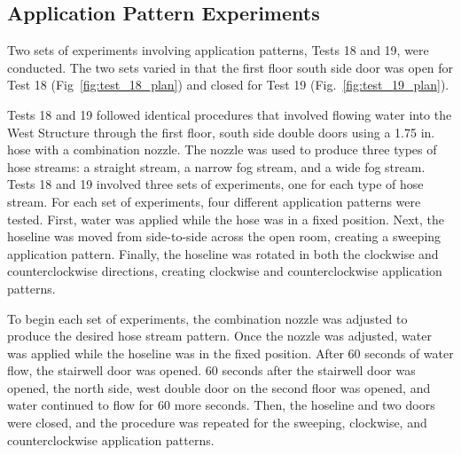 \documentclass[12pt,oneside]{book}
\begin{document}
\subsection{Application Pattern Experiments}
\label{Application_Pattern_Experiments}

Two sets of experiments involving application patterns, Tests 18 and 19, were conducted. The two sets varied in that the first floor south side door was open for Test 18 (Fig~\ref{fig:test_18_plan}) and closed for Test 19 (Fig.~\ref{fig:test_19_plan}).

Tests 18 and 19 followed identical procedures that involved flowing water into the West Structure through the first floor, south side double doors using a 1.75 in. hose with a combination nozzle. The nozzle was used to produce three types of hose streams: a straight stream, a narrow fog stream, and a wide fog stream. Tests 18 and 19 involved three sets of experiments, one for each type of hose stream. For each set of experiments, four different application patterns were tested. First, water was applied while the hose was in a fixed position. Next, the hoseline was moved from side-to-side across the open room, creating a sweeping application pattern. Finally, the hoseline was rotated in both the clockwise and counterclockwise directions, creating clockwise and counterclockwise application patterns. 

To begin each set of experiments, the combination nozzle was adjusted to produce the desired hose stream pattern. Once the nozzle was adjusted, water was applied while the hoseline was in the fixed position. After 60 seconds of water flow, the stairwell door was opened. 60 seconds after the stairwell door was opened, the north side, west double door on the second floor was opened, and water continued to flow for 60 more seconds. Then, the hoseline and two doors were closed, and the procedure was repeated for the sweeping, clockwise, and counterclockwise application patterns.
\end{document}
